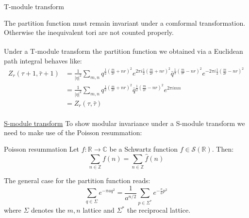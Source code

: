 \documentclass[11pt,aspectratio=169]{beamer}
\begin{document}
\begin{frame}{T-module transform}

	The partition function must remain invariant under a comformal transformation. Otherwise the inequivalent tori are not counted properly. 
	\\~\\
	Under a T-module transform the partition function we obtained via a Euclidean path integral behaves like:
	\begin{align*}
		Z_r (\tau + 1, \bar{\tau} + 1) &= \frac{1}{|\eta|^2} \sum_{m, n} q^{\frac{1}{2}(\frac{m}{2r} + nr)^2}e^{2\pi i \frac{1}{2}(\frac{m}{2r} + nr)^2}
		\bar{q}^{\frac{1}{2}(\frac{m}{2r} - nr)^2}e^{-2\pi i \frac{1}{2}(\frac{m}{2r} - nr)^2} \\
		&= \frac{1}{|\eta|^2} \sum_{m, n} q^{\frac{1}{2}(\frac{m}{2r} + nr)^2}\bar{q}^{\frac{1}{2}(\frac{m}{2r} - nr)^2}e^{2 \pi i mn} \\
		&= Z_r (\tau, \bar{\tau}) \\
	\end{align*}

	
\end{frame}

\begin{frame}{\underline{S-module transform}}
	To show modular invariance under a S-module transform we need to make use of the Poisson resummation:
	\begin{block}{Poisson resummation}
		Let $f: \mathbb{R} \rightarrow \mathbb{C}$ be a Schwartz function $f \in \mathcal{S}(\mathbb{R})$.
		Then:
		\begin{equation}
			\sum_{n\in\mathbb{Z}} f(n) = \sum_{n\in\mathbb{Z}} \hat{f}(n)
		\end{equation}
	\end{block}
	The general case for the partition function reads:
	\begin{equation}
		\sum_{q\in \Sigma}e^{-\pi a q^2} = \frac{1}{a^{n/2}}\sum_{p\in \Sigma^*}e^{-\frac{\pi}{a}p^2}
	\end{equation}
	where $\Sigma$ denotes the $m, n$ lattice and $\Sigma^*$ the reciprocal lattice.
\end{frame}
\end{document}
